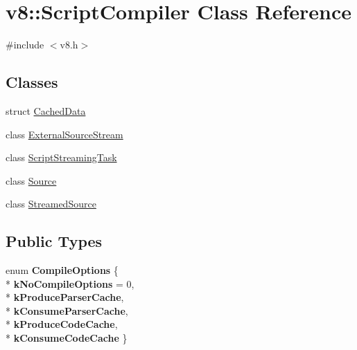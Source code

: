 \hypertarget{classv8_1_1_script_compiler}{}\section{v8\+:\+:Script\+Compiler Class Reference}
\label{classv8_1_1_script_compiler}


{\ttfamily \#include $<$v8.\+h$>$}

\subsection*{Classes}
\begin{DoxyCompactItemize}
\item 
struct \hyperlink{structv8_1_1_script_compiler_1_1_cached_data}{Cached\+Data}
\item 
class \hyperlink{classv8_1_1_script_compiler_1_1_external_source_stream}{External\+Source\+Stream}
\item 
class \hyperlink{classv8_1_1_script_compiler_1_1_script_streaming_task}{Script\+Streaming\+Task}
\item 
class \hyperlink{classv8_1_1_script_compiler_1_1_source}{Source}
\item 
class \hyperlink{classv8_1_1_script_compiler_1_1_streamed_source}{Streamed\+Source}
\end{DoxyCompactItemize}
\subsection*{Public Types}
\begin{DoxyCompactItemize}
\item 
enum {\bfseries Compile\+Options} \{ \\*
{\bfseries k\+No\+Compile\+Options} = 0, 
\\*
{\bfseries k\+Produce\+Parser\+Cache}, 
\\*
{\bfseries k\+Consume\+Parser\+Cache}, 
\\*
{\bfseries k\+Produce\+Code\+Cache}, 
\\*
{\bfseries k\+Consume\+Code\+Cache}
 \}\hypertarget{classv8_1_1_script_compiler_aa6db7774ab5d8793cd88db6b35a71818}{}\label{classv8_1_1_script_compiler_aa6db7774ab5d8793cd88db6b35a71818}

\end{DoxyCompactItemize}

